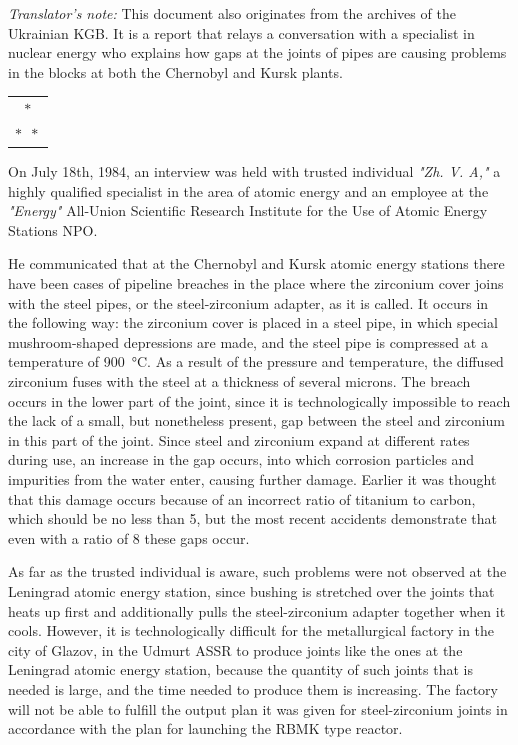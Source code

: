 \documentclass[openright]{bookest}
\newcommand{\varthreestars}{\begin{center}\begin{tabular}{c}$\ast$\\[-0.8ex] $\ast\enspace \ast $\end{tabular}\end{center}}
\begin{document}
\textit{Translator's note:} This document also originates from the archives of the Ukrainian KGB. It is a report that relays a conversation with a specialist in nuclear energy who explains how gaps at the joints of pipes are causing problems in the blocks at both the Chernobyl and Kursk plants.

\varthreestars

On July 18th, 1984, an interview was held with trusted individual \textit{"Zh. V. A,"} a highly qualified specialist in the area of atomic energy and an employee at the \textit{"Energy"} All-Union Scientific Research Institute for the Use of Atomic Energy Stations NPO.

He communicated that at the Chernobyl and Kursk atomic energy stations there have been cases of pipeline breaches in the place where the zirconium cover joins with the steel pipes, or the steel-zirconium adapter, as it is called. It occurs in the following way: the zirconium cover is placed in a steel pipe, in which special mushroom-shaped depressions are made, and the steel pipe is compressed at a temperature of \qty{900}{\celsius}. As a result of the pressure and temperature, the diffused zirconium fuses with the steel at a thickness of several microns. The breach occurs in the lower part of the joint, since it is technologically impossible to reach the lack of a small, but nonetheless present, gap between the steel and zirconium in this part of the joint. Since steel and zirconium expand at different rates during use, an increase in the gap occurs, into which corrosion particles and impurities from the water enter, causing further damage. Earlier it was thought that this damage occurs because of an incorrect ratio of titanium to carbon, which should be no less than 5, but the most recent accidents demonstrate that even with a ratio of 8 these gaps occur.

As far as the trusted individual is aware, such problems were not observed at the Leningrad atomic energy station, since bushing is stretched over the joints that heats up first and additionally pulls the steel-zirconium adapter together when it cools. However, it is technologically difficult for the metallurgical factory in the city of Glazov, in the Udmurt ASSR to produce joints like the ones at the Leningrad atomic energy station, because the quantity of such joints that is needed is large, and the time needed to produce them is increasing. The factory will not be able to fulfill the output plan it was given for steel-zirconium joints in accordance with the plan for launching the RBMK type reactor.
\end{document}
